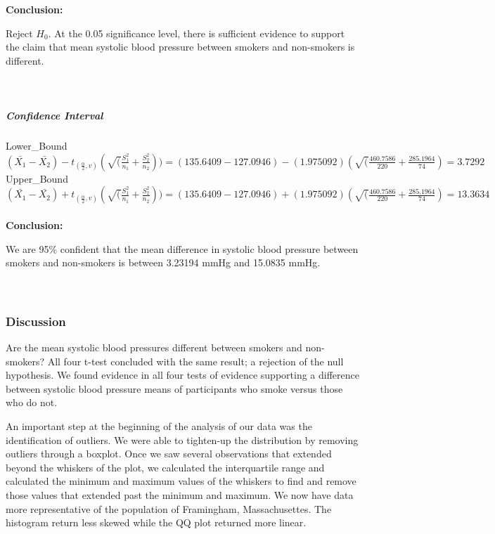 \documentclass[
]{article}
\begin{document}
\textbf{Conclusion:}

Reject \(H_{0}\). At the 0.05 significance level, there is sufficient
evidence to support the claim that mean systolic blood pressure between
smokers and non-smokers is different.\\
~\\
~\\

\hypertarget{confidence-interval-3}{%
\subparagraph{\texorpdfstring{\textbf{Confidence
Interval}}{Confidence Interval}}\label{confidence-interval-3}}

\hfill\break
Lower\_Bound\\
\((\bar{X_{1}}-\bar{X_{2}}) - t_{(\frac{\alpha}{2},v)}(\sqrt(\frac{S^2_{1}}{n_{1}}+\frac{S^2_{2}}{n_{2}})) = (135.6409 - 127.0946) - (1.975092)(\sqrt(\frac{460.7586}{220}+\frac{285.1964}{74}) = 3.7292\)\\

Upper\_Bound\\
\((\bar{X_{1}}-\bar{X_{2}}) + t_{(\frac{\alpha}{2},v)}(\sqrt(\frac{S^2_{1}}{n_{1}}+\frac{S^2_{2}}{n_{2}})) = (135.6409 - 127.0946) + (1.975092)(\sqrt(\frac{460.7586}{220}+\frac{285.1964}{74}) = 13.3634\)\\
~\\

\textbf{Conclusion:}

We are 95\% confident that the mean difference in systolic blood
pressure between smokers and non-smokers is between 3.23194 mmHg and
15.0835 mmHg.\\
~\\
~\\

\hypertarget{discussion}{%
\subsubsection{Discussion}\label{discussion}}

Are the mean systolic blood pressures different between smokers and
non-smokers? All four t-test concluded with the same result; a rejection
of the null hypothesis. We found evidence in all four tests of evidence
supporting a difference between systolic blood pressure means of
participants who smoke versus those who do not.

An important step at the beginning of the analysis of our data was the
identification of outliers. We were able to tighten-up the distribution
by removing outliers through a boxplot. Once we saw several observations
that extended beyond the whiskers of the plot, we calculated the
interquartile range and calculated the minimum and maximum values of the
whiskers to find and remove those values that extended past the minimum
and maximum. We now have data more representative of the population of
Framingham, Massachusettes. The histogram return less skewed while the
QQ plot returned more linear.
\end{document}
